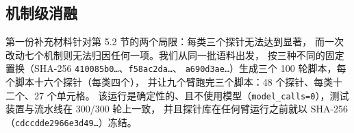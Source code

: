 \subsection{机制级消融}

第一份补充材料针对第 5.2 节的两个局限：每类三个探针无法达到显著，
而一次改动七个机制则无法归因任何一项。我们从同一批语料出发，
按三种不同的固定置换（SHA-256 \texttt{410085b0\ldots}、\texttt{f58ac2da\ldots}、
\texttt{a690d3ae\ldots}）生成三个 100 轮脚本，每个脚本十六个探针（每类四个），
并让九个臂跑完三个脚本：48 个探针、每类十二个、27 个单元格。
该运行是确定性的、且不使用模型（\texttt{model\_calls=0}），测试装置与流水线在 300/300 轮上一致，
并且探针库在任何臂运行之前就以 SHA-256（\texttt{cdccdde2966e3d49\ldots}）冻结。

